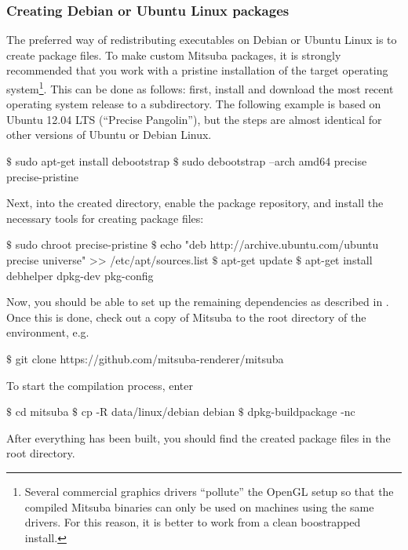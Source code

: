 \subsubsection{Creating Debian or Ubuntu Linux packages}
The preferred way of redistributing executables on Debian or Ubuntu Linux is to create
 package files. To make custom Mitsuba packages, it is strongly recommended
that you work with a pristine installation of the target operating system\footnote{Several commercial graphics
drivers ``pollute'' the OpenGL setup so that the compiled Mitsuba binaries
can only be used on machines using the same drivers. For this reason, it is
better to work from a clean boostrapped install.}. This can be done as follows:
first, install  and download the most recent operating system release
to a subdirectory. The following example is based on Ubuntu 12.04 LTS (``Precise Pangolin''),
but the steps are almost identical for other versions of Ubuntu or Debian Linux.
\begin{shell}
$\text{\$}$ sudo apt-get install debootstrap
$\text{\$}$ sudo debootstrap --arch amd64 precise precise-pristine
\end{shell}
Next,  into the created directory, enable the  package repository,
and install the necessary tools for creating package files:
\begin{shell}
$\text{\$}$ sudo chroot precise-pristine
$\text{\$}$ echo "deb http://archive.ubuntu.com/ubuntu precise universe" >> /etc/apt/sources.list
$\text{\$}$ apt-get update
$\text{\$}$ apt-get install debhelper dpkg-dev pkg-config
\end{shell}
Now, you should be able to set up the remaining dependencies as described in .
Once this is done, check out a copy of Mitsuba to the root directory of the  environment, e.g.
\begin{shell}
$\text{\$}$ git clone https://github.com/mitsuba-renderer/mitsuba
\end{shell}
To start the compilation process, enter
\begin{shell}
$\text{\$}$ cd mitsuba
$\text{\$}$ cp -R data/linux/debian debian
$\text{\$}$ dpkg-buildpackage -nc
\end{shell}
After everything has been built, you should find the created package files
in the root directory.
